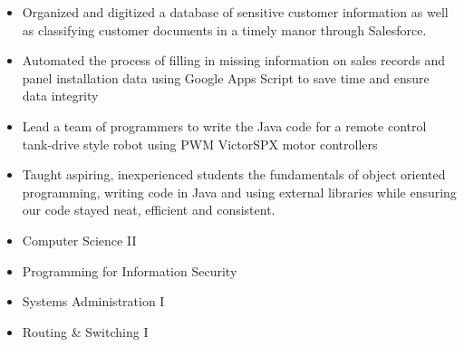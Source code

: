 

\begin{itemize}
\item Organized and digitized a database of sensitive customer information as well as classifying customer documents in a timely manor through Salesforce.
\item Automated the process of filling in missing information on sales records and panel installation data using Google Apps Script to save time and ensure data integrity
\end{itemize}

\divider

\begin{itemize}
\item Lead a team of programmers to write the Java code for a remote control tank-drive style robot using PWM VictorSPX motor controllers
\item Taught aspiring, inexperienced students the fundamentals of object oriented programming, writing code in Java and using external libraries while ensuring our code stayed neat, efficient and consistent. 
\end{itemize}

\vspace{.075in}

{}
\smallskip
\begin{itemize}
\item Computer Science II
\smallskip
\item Programming for Information Security
\smallskip
\item Systems Administration I
\smallskip
\item Routing \& Switching I
\end{itemize}

